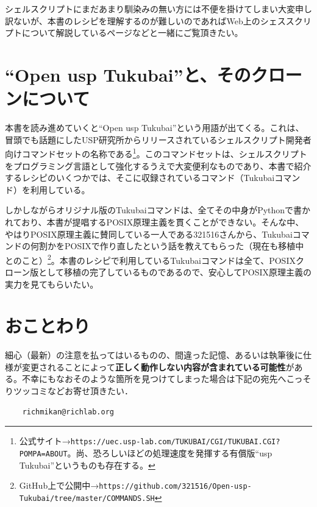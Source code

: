 シェルスクリプトにまだあまり馴染みの無い方には不便を掛けてしまい大変申し訳ないが、本書のレシピを理解するのが難しいのであればWeb上のシェススクリプトについて解説しているページなどと一緒にご覧頂きたい。


\section*{``Open usp Tukubai''と、そのクローンについて}

本書を読み進めていくと``Open usp Tukubai''という用語が出てくる。これは、冒頭でも話題にしたUSP研究所からリリースされているシェルスクリプト開発者向けコマンドセットの名称である\footnote{公式サイト→\verb|https://uec.usp-lab.com/TUKUBAI/CGI/TUKUBAI.CGI?POMPA=ABOUT|。尚、恐ろしいほどの処理速度を発揮する有償版``usp Tukubai''というものも存在する。}。このコマンドセットは、シェルスクリプトをプログラミング言語として強化するうえで大変便利なものであり、本書で紹介するレシピのいくつかでは、そこに収録されているコマンド（Tukubaiコマンド）を利用している。

しかしながらオリジナル版のTukubaiコマンドは、全てその中身がPythonで書かれており、本書が提唱するPOSIX原理主義を貫くことができない。そんな中、やはりPOSIX原理主義に賛同している一人である321516さんから、Tukubaiコマンドの何割かをPOSIXで作り直したという話を教えてもらった（現在も移植中とのこと）\footnote{GitHub上で公開中→\verb|https://github.com/321516/Open-usp-Tukubai/tree/master/COMMANDS.SH|}。本書のレシピで利用しているTukubaiコマンドは全て、POSIXクローン版として移植の完了しているものであるので、安心してPOSIX原理主義の実力を見てもらいたい。


\section*{おことわり}

細心（最新）の注意を払ってはいるものの、間違った記憶、あるいは執筆後に仕様が変更されることによって\textbf{正しく動作しない内容が含まれている可能性}がある。不幸にもなおそのような箇所を見つけてしまった場合は下記の宛先へこっそりツッコミなどお寄せ頂きたい．

\begin{verbatim}
	richmikan@richlab.org
\end{verbatim}

